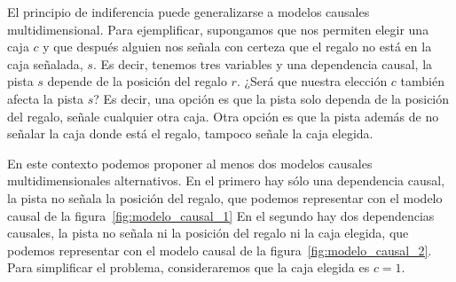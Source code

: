 \documentclass[a4paper,10pt]{book}
\theoremstyle{definition}
\begin{document}

El principio de indiferencia puede generalizarse a modelos causales multidimensional.
%
Para ejemplificar, supongamos que nos permiten elegir una caja $c$ y que despu\'es alguien nos se\~nala con certeza que el regalo no est\'a en la caja se\~nalada, $s$.
%
Es decir, tenemos tres variables y una dependencia causal, la pista $s$ depende de la posici\'on del regalo $r$.
%
¿Ser\'a que nuestra elecci\'on $c$ tambi\'en afecta la pista $s$?
%
Es decir, una opci\'on es que la pista solo dependa de la posici\'on del regalo, señale cualquier otra caja.
%
Otra opci\'on es que la pista adem\'as de no se\~nalar la caja donde est\'a el regalo, tampoco se\~nale la caja elegida.


En este contexto podemos proponer al menos dos modelos causales multidimensionales alternativos.
%
En el primero hay s\'olo una dependencia causal, la pista no se\~nala la posici\'on del regalo, que podemos representar con el modelo causal de la figura~\ref{fig:modelo_causal_1}
%
En el segundo hay dos dependencias causales, la pista no se\~nala ni la posici\'on del regalo ni la caja elegida, que podemos representar con el modelo causal de la figura~\ref{fig:modelo_causal_2}.
%
Para simplificar el problema, consideraremos que la caja elegida es $c=1$.

\end{document}
